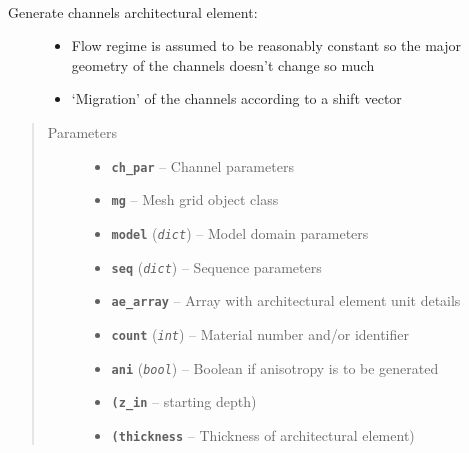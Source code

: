 \documentclass[letterpaper,10pt,english]{sphinxmanual}
\begin{document}
\begin{fulllineitems}
\label{hyvr:hyvr.hyvr.sim.gen_channel}~\begin{description}
\item[{Generate channels architectural element:}] \leavevmode\begin{itemize}
\item {} 
Flow regime is assumed to be reasonably constant so the major geometry of the channels doesn't change so much

\item {} 
`Migration' of the channels according to a shift vector

\end{itemize}

\end{description}
\begin{quote}\begin{description}
\item[{Parameters}] \leavevmode\begin{itemize}
\item {} 
\textbf{\texttt{ch\_par}} -- Channel parameters

\item {} 
\textbf{\texttt{mg}} -- Mesh grid object class

\item {} 
\textbf{\texttt{model}} (\emph{\texttt{dict}}) -- Model domain parameters

\item {} 
\textbf{\texttt{seq}} (\emph{\texttt{dict}}) -- Sequence parameters

\item {} 
\textbf{\texttt{ae\_array}} -- Array with architectural element unit details

\item {} 
\textbf{\texttt{count}} (\emph{\texttt{int}}) -- Material number and/or identifier

\item {} 
\textbf{\texttt{ani}} (\emph{\texttt{bool}}) -- Boolean if anisotropy is to be generated

\item {} 
\textbf{\texttt{(z\_in}} -- starting depth)

\item {} 
\textbf{\texttt{(thickness}} -- Thickness of architectural element)


\end{itemize}
\end{description}
\end{quote}
\end{fulllineitems}
\end{document}
